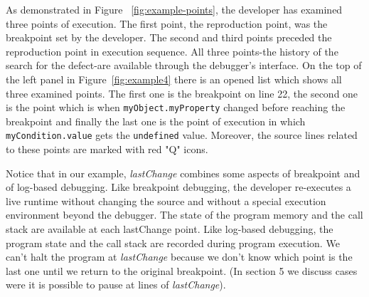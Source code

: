\documentclass[runningheads,a4paper]{llncs}
\begin{document}
As demonstrated in Figure ~\ref{fig:example-points}, the developer has
examined three points of execution. The first point, the reproduction point,  was the breakpoint set by the developer.
The second and third points preceded the reproduction point in execution sequence.
All three points-the history
of the search for the defect-are available through the debugger's
interface. On the top of the left panel in Figure~\ref{fig:example4}
there is an opened list which shows all three examined points. The
first one is the breakpoint on line 22, the second one is the point
which is when \texttt{myObject.myProperty} changed before
reaching the breakpoint and finally the last one is the point of
execution in which \texttt{myCondition.value} gets the
\texttt{undefined} value. Moreover, the source lines related to these
points are marked with red "Q" icons.


Notice that in our example, \textit{lastChange} combines some aspects
of breakpoint and of log-based debugging. Like breakpoint debugging,
the developer re-executes a live runtime without changing the source
and without a special execution environment beyond the debugger. The
state of the program memory and the call stack are available at each
lastChange point. Like log-based debugging, the program state and the
call stack are recorded during program execution. We can't halt the
program at \textit{lastChange} because we don't know which point is the last
one until we return to the original breakpoint. (In section 5 we
discuss cases were it is possible to pause at lines of \textit{lastChange}).
\end{document}
